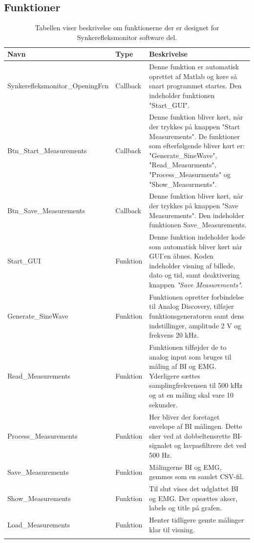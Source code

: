\subsection{Funktioner}
\begin{table}[H]

\begin{tabularx}{\textwidth}{l l X}
     Navn	&	Type		&	Beskrivelse \\ \midrule
     Synkerefleksmonitor\_OpeningFcn   	& 	Callback  	& 	Denne funktion er automatisk oprettet af Matlab og køre så snart programmet startes. Den indeholder funktionen "Start\_GUI".  \\ 			  \addlinespace[2mm]
     Btn\_Start\_Measurements	&	Callback	&	Denne funktion bliver kørt, når der trykkes på knappen "Start Measurements". De funktioner som efterfølgende bliver kørt er: "Generate\_SineWave", "Read\_Measurments", "Process\_Measurments" og "Show\_Measurments". \\   \addlinespace[2mm]
     Btn\_Save\_Measurements	&	Callback	&	Denne funktion bliver kørt, når der trykkes på knappen "Save Measurements". Den indeholder funktionen Save\_Measurements.\\   \addlinespace[2mm]
     Start\_GUI	&	Funktion	&	Denne funktion indeholder kode som automatisk bliver kørt når GUI'en åbnes. Koden indeholder visning af billede, dato og tid, samt deaktivering knappen \textit{"Save Measurements"}. \\   \addlinespace[2mm]
     Generate\_SineWave	&	Funktion	&	Funktionen opretter forbindelse til Analog Discovery, tilføjer funktionsgeneratoren samt dens indstillinger, amplitude 2 V og frekvens 20 kHz.\\   \addlinespace[2mm]
     Read\_Measurements	&	Funktion	&	Funktionen tilføjder de to analog input som bruges til måling af BI og EMG. Yderligere sættes samplingfrekvensen til 500 kHz og at en måling skal vare 10 sekunder.\\   \addlinespace[2mm]
     Process\_Measurements	&	Funktion	&	Her bliver der foretaget envelope af BI målingen. Dette sker ved at dobbeltensrette BI-signalet og lavpasfiltrere det ved 500 Hz.   \\   \addlinespace[2mm]
     Save\_Measurements	&	Funktion	&	Målingerne BI og EMG, gemmes som en samlet CSV-fil.\\   \addlinespace[2mm]
     Show\_Measurements	&	Funktion	&	Til slut vises det udglattet BI og EMG. Der opsættes akser, labels og title på grafen.\\   \addlinespace[2mm]
     Load\_Measurements	&	Funktion	&	Henter tidligere gemte målinger klar til visning.\\   \addlinespace[2mm]
   
     \bottomrule                                                                                                                   
    \end{tabularx}
    \caption {Tabellen viser beskrivelse om funktionerne der er designet for Synkerefleksmonitor software del.}
    \label{tab:sw1}
	
\end{table}




